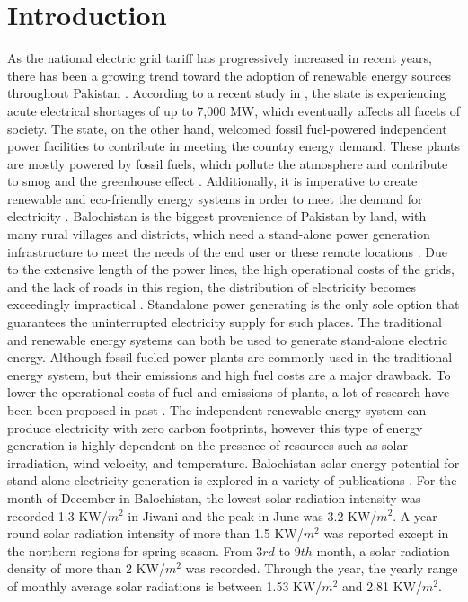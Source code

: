 \documentclass[conference]{IEEEtran}
\begin{document}
\section{Introduction}
As the national electric grid tariff has progressively increased in recent years, there has been a growing trend toward the adoption of renewable energy sources throughout Pakistan \cite{1,nn1,nnn2,nnn3,nnn4}. According to a recent study in \cite{2}, the state is experiencing acute electrical shortages of up to 7,000 MW, which eventually affects all facets of society. The state, on the other hand, welcomed fossil fuel-powered independent power facilities to contribute in meeting the country energy demand. These plants are mostly powered by fossil fuels, which pollute the atmosphere and contribute to smog and the greenhouse effect \cite{3}. Additionally, it is imperative to create renewable and eco-friendly energy systems in order to meet the demand for electricity \cite{4}.\newline
Balochistan is the biggest provenience of Pakistan by land, with many rural villages and districts, which need a stand-alone power generation infrastructure to meet the needs of the end user or these remote locations \cite{5}. Due to the extensive length of the power lines, the high operational costs of the grids, and the lack of roads in this region, the distribution of electricity becomes exceedingly impractical \cite{ali2015modeling}. Standalone power generating is the only sole option that guarantees the uninterrupted electricity supply for such places. The traditional and renewable energy systems can both be used to generate stand-alone electric energy. Although fossil fueled power plants are commonly used in the traditional energy system, but their emissions and high fuel costs are a major drawback. To lower the operational costs of fuel and emissions of plants, a lot of research have been been proposed in past \cite{ahmed2014performance,alvi2022novel,ahmed3914038multi,ahmed2022novel}. The independent renewable energy system can produce electricity with zero carbon footprints, however this type of energy generation is highly dependent on the presence of resources such as solar irradiation, wind velocity, and temperature.\newline
Balochistan solar energy potential for stand-alone electricity generation is explored in a variety of publications \cite{urooj2017assessment,ismail2014optimal}. For the month of December in Balochistan, the lowest solar radiation intensity was recorded 1.3 KW/$m^2$ in Jiwani and the peak in June was 3.2 KW/$m^2$. A year-round solar radiation intensity of more than 1.5 KW/$m^2$ was reported except in the northern regions for spring season. From $3rd$ to $9th$ month, a solar radiation density of more than 2 KW/$m^2$ was recorded. Through the year, the yearly range of monthly average solar radiations is between 1.53 KW/$m^2$ and 2.81 KW/$m^2$.\newline
\end{document}
